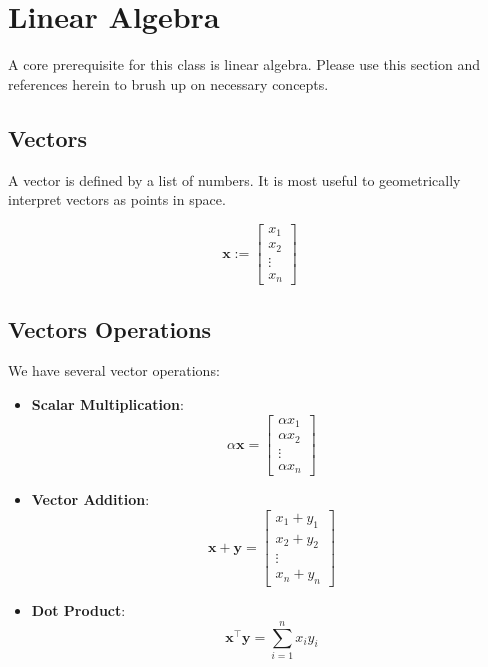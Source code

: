 \section{Linear Algebra}
A core prerequisite for this class is linear algebra. Please use this section and references herein to brush up on necessary concepts.
\subsection{Vectors}

A vector is defined by a list of numbers. It is most useful to geometrically interpret vectors as points in space.

\begin{equation}
    \bm{x} := \begin{bmatrix} x_1 \\ x_2 \\ \vdots \\ x_n \end{bmatrix}
\end{equation}
\subsection{Vectors Operations}

We have several vector operations:
\begin{itemize}
    \item \textbf{Scalar Multiplication}:
          \begin{equation}
              \alpha \bm{x} = \begin{bmatrix} \alpha x_1 \\ \alpha x_2 \\ \vdots \\ \alpha x_n \end{bmatrix}
          \end{equation}

    \item \textbf{Vector Addition}:
          \begin{equation}
              \bm{x} + \bm{y} = \begin{bmatrix} x_1 + y_1 \\ x_2 + y_2 \\ \vdots \\ x_n + y_n \end{bmatrix}
          \end{equation}

    \item \textbf{Dot Product}:
          \begin{equation}
              \bm{x} ^\top \bm{y} = \sum^n_{i=1} x_i y_i
          \end{equation}
\end{itemize}

